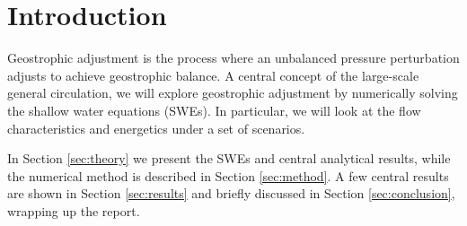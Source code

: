 \section{Introduction}
\label{sec:introduction}
Geostrophic adjustment is the process where an unbalanced pressure perturbation adjusts to achieve geostrophic balance. A central concept of the large-scale general circulation, we will explore geostrophic adjustment by numerically solving the shallow water equations (SWEs). In particular, we will look at the flow characteristics and energetics under a set of scenarios.

In Section \ref{sec:theory} we present the SWEs and central analytical results, while the numerical method is described in Section \ref{sec:method}. A few central results are shown in Section \ref{sec:results} and briefly discussed in Section \ref{sec:conclusion}, wrapping up the report.
